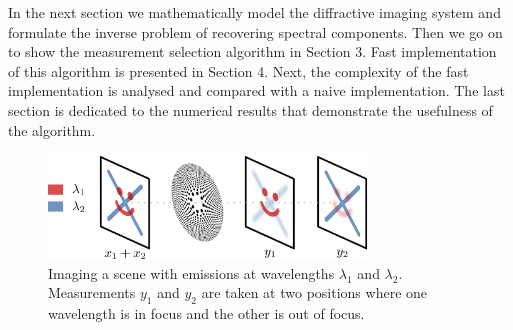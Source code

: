 \documentclass{article}
\begin{document}
In the next section we mathematically model the diffractive imaging system and
formulate the inverse problem of recovering spectral components. Then we go on
to show the measurement selection algorithm in Section 3. Fast implementation of
this algorithm is presented in Section 4. Next, the complexity of the fast
implementation is analysed and compared with a naive implementation. The last
section is dedicated to the numerical results that demonstrate the usefulness of
the algorithm.





\begin{figure}[htb]
  \begin{minipage}[b]{1\linewidth}
    \centering
    \centerline{\includegraphics[width=8.5cm]{drawing}}
  \end{minipage}
  \caption{Imaging a scene with emissions at wavelengths $\lambda_1$ and
  $\lambda_2$. Measurements $y_1$ and $y_2$ are taken at two positions where one wavelength
  is in focus and the other is out of focus.}
  \label{fig:pssi_drawing}
\end{figure}
\end{document}
